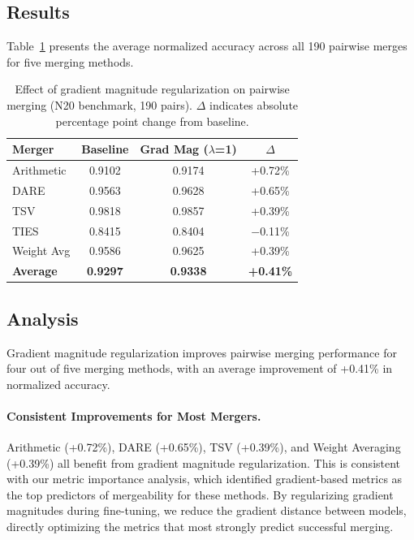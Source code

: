 \subsection{Results}

Table~\ref{tab:pairwise_grad_mag} presents the average normalized accuracy across all 190 pairwise merges for five merging methods.

\begin{table}[h]
\centering
\caption{Effect of gradient magnitude regularization on pairwise merging (N20 benchmark, 190 pairs). $\Delta$ indicates absolute percentage point change from baseline.}
\label{tab:pairwise_grad_mag}
\begin{tabular}{lccc}
\toprule
\textbf{Merger} & \textbf{Baseline} & \textbf{Grad Mag ($\lambda$=1)} & \textbf{$\Delta$} \\
\midrule
Arithmetic & 0.9102 & 0.9174 & +0.72\% \\
DARE       & 0.9563 & 0.9628 & +0.65\% \\
TSV        & 0.9818 & 0.9857 & +0.39\% \\
TIES       & 0.8415 & 0.8404 & $-$0.11\% \\
Weight Avg & 0.9586 & 0.9625 & +0.39\% \\
\midrule
\textbf{Average} & \textbf{0.9297} & \textbf{0.9338} & \textbf{+0.41\%} \\
\bottomrule
\end{tabular}
\end{table}

\subsection{Analysis}

Gradient magnitude regularization improves pairwise merging performance for four out of five merging methods, with an average improvement of +0.41\% in normalized accuracy.

\paragraph{Consistent Improvements for Most Mergers.}
Arithmetic (+0.72\%), DARE (+0.65\%), TSV (+0.39\%), and Weight Averaging (+0.39\%) all benefit from gradient magnitude regularization. This is consistent with our metric importance analysis, which identified gradient-based metrics as the top predictors of mergeability for these methods. By regularizing gradient magnitudes during fine-tuning, we reduce the gradient distance between models, directly optimizing the metrics that most strongly predict successful merging.

